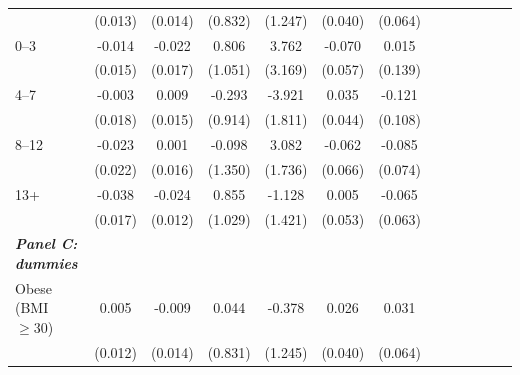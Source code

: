 \documentclass[12pt,english]{article}
\providecommand{\DIFaddtex}[1]{{\protect\color{blue}#1}} %
\providecommand{\DIFaddFL}[1]{\DIFadd{#1}} %
\providecommand{\DIFadd}[1]{\texorpdfstring{\DIFaddtex{#1}}{#1}} %
\begin{document}
\begin{table}[!ht]
\begin{center}
\begin{adjustbox}{max width=.9\linewidth}
\begin{threeparttable}
{\begin{tabular}{l*{6}{S S}}
						&  \DIFaddFL{(0.013)         }&  \DIFaddFL{(0.014)         }&  \DIFaddFL{(0.832)         }&  \DIFaddFL{(1.247)         }&  \DIFaddFL{(0.040)         }&  \DIFaddFL{(0.064)         }\\
						\DIFaddFL{0--3 }&   \DIFaddFL{-0.014         }&   \DIFaddFL{-0.022         }&    \DIFaddFL{0.806         }&    \DIFaddFL{3.762         }&   \DIFaddFL{-0.070         }&    \DIFaddFL{0.015         }\\
						&  \DIFaddFL{(0.015)         }&  \DIFaddFL{(0.017)         }&  \DIFaddFL{(1.051)         }&  \DIFaddFL{(3.169)         }&  \DIFaddFL{(0.057)         }&  \DIFaddFL{(0.139)         }\\
						\DIFaddFL{4--7 }&    \DIFaddFL{-0.003         }&    \DIFaddFL{0.009         }&   \DIFaddFL{-0.293         }&   \DIFaddFL{-3.921}\sym{**} &    \DIFaddFL{0.035         }&   \DIFaddFL{-0.121         }\\
						&  \DIFaddFL{(0.018)         }&  \DIFaddFL{(0.015)         }&  \DIFaddFL{(0.914)         }&  \DIFaddFL{(1.811)         }&  \DIFaddFL{(0.044)         }&  \DIFaddFL{(0.108)         }\\
						\DIFaddFL{8--12 }&    \DIFaddFL{-0.023         }&    \DIFaddFL{0.001         }&   \DIFaddFL{-0.098         }&    \DIFaddFL{3.082}\sym{*}  &   \DIFaddFL{-0.062         }&   \DIFaddFL{-0.085         }\\
						&  \DIFaddFL{(0.022)         }&  \DIFaddFL{(0.016)         }&  \DIFaddFL{(1.350)         }&  \DIFaddFL{(1.736)         }&  \DIFaddFL{(0.066)         }&  \DIFaddFL{(0.074)         }\\
						\DIFaddFL{13+ }&    \DIFaddFL{-0.038}\sym{**} &   \DIFaddFL{-0.024}\sym{*}  &    \DIFaddFL{0.855         }&   \DIFaddFL{-1.128         }&    \DIFaddFL{0.005         }&   \DIFaddFL{-0.065         }\\
						&  \DIFaddFL{(0.017)         }&  \DIFaddFL{(0.012)         }&  \DIFaddFL{(1.029)         }&  \DIFaddFL{(1.421)         }&  \DIFaddFL{(0.053)         }&  \DIFaddFL{(0.063)         }\\
						\textit{\textbf{\DIFaddFL{Panel C: dummies}}} &&&&&&\\
						\DIFaddFL{Obese (BMI $\geq 30$)}&    \DIFaddFL{0.005         }&   \DIFaddFL{-0.009         }&    \DIFaddFL{0.044         }&   \DIFaddFL{-0.378         }&    \DIFaddFL{0.026         }&    \DIFaddFL{0.031         }\\
						&  \DIFaddFL{(0.012)         }&  \DIFaddFL{(0.014)         }&  \DIFaddFL{(0.831)         }&  \DIFaddFL{(1.245)         }&  \DIFaddFL{(0.040)         }&  \DIFaddFL{(0.064)         }\\

\end{tabular}}
\end{threeparttable}
\end{adjustbox}
\end{center}
\end{table}
\end{document}
